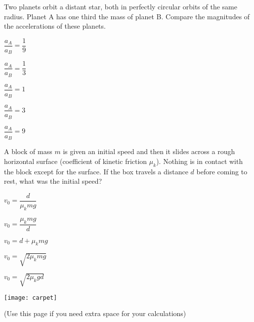 \documentclass[11pt]{article}
\begin{document}
\begin{enumerate}
\begin{minipage}[t]{\lw}
\item Two planets orbit a distant star, both in perfectly circular orbits of the same radius. Planet A has one third the mass of planet B. Compare the magnitudes of the accelerations of these planets.
\begin{choices}
\item $\dfrac{a_A}{a_B}=\dfrac{1}{9}$
\item $\dfrac{a_A}{a_B}=\dfrac{1}{3}$
\item $\dfrac{a_A}{a_B}=1$
\item $\dfrac{a_A}{a_B}=3$
\item $\dfrac{a_A}{a_B}=9$
\end{choices}
\end{minipage}

\begin{minipage}[t]{\lw}
\item A block of mass $m$ is given an initial speed and then it slides across a rough horizontal surface (coefficient of kinetic friction $\mu_k$). Nothing is in contact with the block except for the surface. If the box travels a distance $d$ before coming to rest, what was the initial speed?\\
\begin{minipage}[t]{.5\lw}
\begin{choices}
\item $v_0=\dfrac{d}{\mu_kmg}$\\[.025in]
\item $v_0=\dfrac{\mu_kmg}{d}$\\[.025in]
\item $v_0=d+\mu_kmg$\\[.025in]
\item $v_0=\sqrt{2\mu_kmg}$\\[.025in]
\item $v_0=\sqrt{2\mu_kgd}$
\end{choices}
\end{minipage}\hfill
\begin{minipage}[t]{.45\lw}
\vspace{0in}
\flushright
\texttt{[image: carpet]}
\end{minipage}
\end{minipage}


\end{enumerate}

\newpage
\thispagestyle{empty}
{\footnotesize (Use this page if you need extra space for your calculations)}
\end{document}
